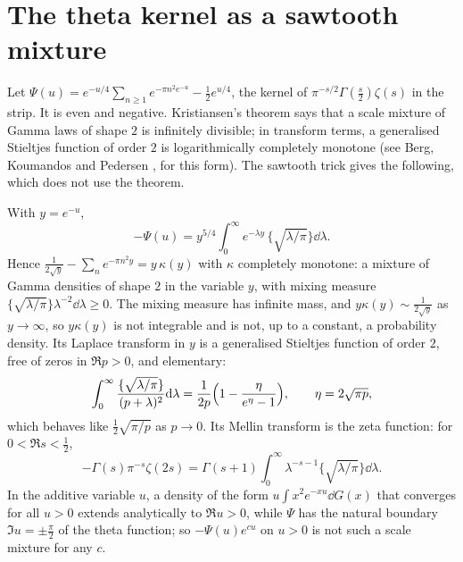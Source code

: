 \section{The theta kernel as a sawtooth mixture}\label{lg:sec:theta}
Let $\Psi(u)=e^{-u/4}\sum_{n\ge1}e^{-\pi n^2e^{-u}}-\frac12e^{u/4}$, the kernel of $\pi^{-s/2}\Gamma(\frac s2)\zeta(s)$ in the strip. It is even and negative. Kristiansen's theorem \cite{Kristiansen94} says that a scale mixture of Gamma laws of shape $2$ is infinitely divisible; in transform terms, a generalised Stieltjes function of order $2$ is logarithmically completely monotone (see Berg, Koumandos and Pedersen \cite{BKP19}, for this form). The sawtooth trick gives the following, which does not use the theorem.
\begin{theorem}\label{lg:thm:pk}
With $y=e^{-u}$,
\[
-\Psi(u)=y^{5/4}\int_0^\infty e^{-\lambda y}\,\bigl\{\sqrt{\lambda/\pi}\bigr\}\dd\lambda .
\]
Hence $\frac1{2\sqrt y}-\sum_ne^{-\pi n^2y}=y\,\kappa(y)$ with $\kappa$ completely monotone: a mixture of Gamma densities of shape $2$ in the variable $y$, with mixing measure $\{\sqrt{\lambda/\pi}\}\lambda^{-2}\dd\lambda\ge0$. The mixing measure has infinite mass, and $y\kappa(y)\sim\frac1{2\sqrt y}$ as $y\to\infty$, so $y\kappa(y)$ is not integrable and is not, up to a constant, a probability density. Its Laplace transform in $y$ is a generalised Stieltjes function of order $2$, free of zeros in $\Re p>0$, and elementary:
\[
\int_0^\infty\frac{\{\sqrt{\lambda/\pi}\}}{(p+\lambda)^2}\mathrm{d}\lambda=\frac1{2p}\Bigl(1-\frac\eta{e^\eta-1}\Bigr),\qquad\eta=2\sqrt{\pi p},
\]
which behaves like $\frac12\sqrt{\pi/p}$ as $p\to0$. Its Mellin transform is the zeta function: for $0<\Re s<\frac12$,
\[
-\Gamma(s)\pi^{-s}\zeta(2s)=\Gamma(s+1)\int_0^\infty\lambda^{-s-1}\bigl\{\sqrt{\lambda/\pi}\bigr\}\dd\lambda .
\]
In the additive variable $u$, a density of the form $u\int x^2e^{-xu}\dd G(x)$ that converges for all $u>0$ extends analytically to $\Re u>0$, while $\Psi$ has the natural boundary $\Im u=\pm\frac\pi2$ of the theta function; so $-\Psi(u)e^{cu}$ on $u>0$ is not such a scale mixture for any $c$.
\end{theorem}

